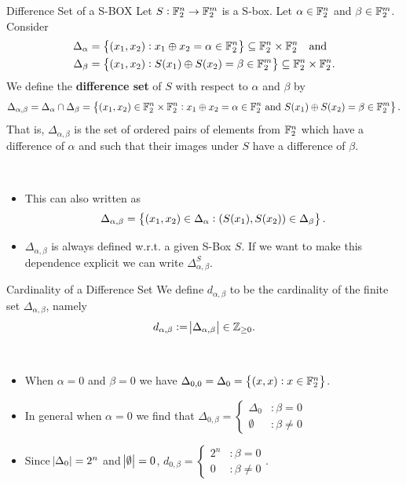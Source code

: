 \documentclass[11pt,openany]{article}
\begin{document}
\begin{defbox}{Difference Set of a S-BOX}
Let $S:\mathbb{F}_2^n\to\mathbb{F}_2^m$ is a S-box. Let $\alpha\in\mathbb{F}_2^n$ and $\beta\in\mathbb{F}_2^m$. Consider \begin{align*}
	\Delta_\alpha&=\set{(x_1,x_2):x_1\oplus x_2=\alpha\in\mathbb{F}_2^n}\subseteq\mathbb{F}_2^n\times\mathbb{F}_2^n\quad \text{and}\\
	\Delta_\beta&=\set{(x_1,x_2):S(x_1)\oplus S(x_2)=\beta\in\mathbb{F}_2^m}\subseteq\mathbb{F}_2^n\times\mathbb{F}_2^n.
\end{align*}
We define the \textbf{difference set} of $S$ with respect to $\alpha$ and $\beta$ by \[
\Delta_{\alpha,\beta}=\Delta_\alpha\cap\Delta_\beta=\set{(x_1,x_2)\in\mathbb{F}_2^n\times\mathbb{F}_2^n:x_1\oplus x_2=\alpha\in\mathbb{F}_2^n\ \text{and}\ S(x_1)\oplus S(x_2)=\beta\in\mathbb{F}_2^m}.
\] That is, $\Delta_{\alpha,\beta}$ is the set of ordered pairs of elements from $\mathbb{F}_2^n$ which have a difference of $\alpha$ and such that their images under $S$ have a difference of $\beta$.
\end{defbox}
\begin{remark}
\ \begin{itemize}
	\item This can also written as \[
	\Delta_{\alpha,\beta}=\set{(x_1,x_2)\in\Delta_\alpha:(S(x_1),S(x_2))\in\Delta_\beta}.
	\]
	\item $\Delta_{\alpha,\beta}$ is always defined w.r.t. a given S-Box $S$. If we want to make this dependence explicit we can write $\Delta_{\alpha,\beta}^S$.
\end{itemize}
\end{remark}
\vspace{12pt}
\begin{defbox}{Cardinality of a Difference Set}
	We define $d_{\alpha,\beta}$ to be the cardinality of the finite set $\Delta_{\alpha,\beta}$, namely \[
	d_{\alpha,\beta}:=\abs{\Delta_{\alpha,\beta}}\in\mathbb{Z}_{\geq 0}.
	\]
\end{defbox}
\begin{remark}
\ \begin{itemize}
	\item When $\alpha=0$ and $\beta=0$ we have
	$\Delta_{0,0}=\Delta_0=\set{(x,x):x\in\mathbb{F}_2^n}$.
	\item In general when $\alpha=0$ we find that
	$\Delta_{0,\beta}=\begin{cases}
		\Delta_0 &:\beta=0\\
		\emptyset &:\beta\neq 0
	\end{cases}$
	\item  Since $\abs{\Delta_0}=2^n$ and $\abs{\emptyset}=0$,\quad
	$d_{0,\beta}=\begin{cases}
		2^n &:\beta=0 \\
		0 &:\beta\neq 0
	\end{cases}$.
\end{itemize}
\end{remark}
\end{document}
